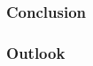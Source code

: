 \begin{frame}[t]
    \frametitle{Conclusion}

\end{frame}

\begin{frame}[t]
    \frametitle{Outlook}

\end{frame}
